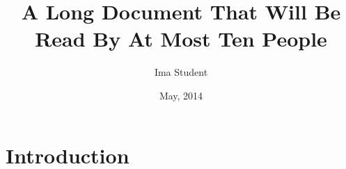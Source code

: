 \documentclass[]{cwru} %
\title{A Long Document That Will Be Read By At Most Ten People}
\author{Ima Student}
\date{May, 2014} %
\begin{document}
% 

\maketitle
\makeapprovalsheet

\frontmatter
\tableofcontents
\listoftables
\listoffigures

\begin{acknowledgements}
\lipsum[1-3]
\end{acknowledgements}

\begin{abstract}
\lipsum[1-1]
\end{abstract}

\mainmatter
\chapter{Introduction}
\lipsum[1-10]
\end{document}
